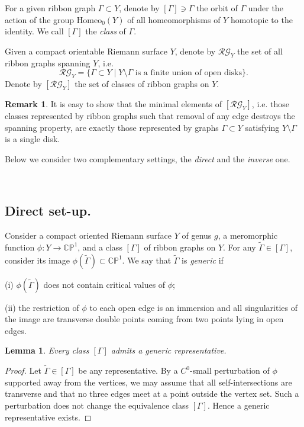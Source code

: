 \documentclass[reqno]{amsart}
\newtheorem{lemma}[theorem]{Lemma}
\theoremstyle{definition}
\newtheorem{remark}[theorem]{Remark}
\newcommand {\Ga}{\Gamma}
\newcommand {\bCP} {\mathbb {CP}}
\newcommand \RG {\mathcal {RG}}
\begin{document}
For a given ribbon graph $\Ga\subset Y$, denote by $[\Ga]\ni \Ga$ the orbit of $\Ga$ under the action of the group $\mathrm{Homeo}_0(Y)$ of all homeomorphisms of $Y$ homotopic to the identity. We call $[\Ga]$ the \emph{class} of $\Ga$.

Given a compact orientable Riemann surface $Y$, denote by $\RG_Y$ the set of all ribbon graphs spanning $Y$, i.e.
\[
\RG_Y=\{\Ga\subset Y\mid Y\setminus \Ga \text{ is a finite union of open disks}\}.
\]
Denote by $[\RG_Y]$ the set of classes of ribbon graphs on $Y$.

\begin{remark}
It is easy to show that the minimal elements of $[\RG_Y]$, i.e.
those classes represented by ribbon graphs such that removal of any edge destroys the spanning property, are exactly those represented by graphs $\Ga\subset Y$ satisfying $Y\setminus \Ga$ is a single disk.
\end{remark}

Below we consider two complementary settings, the \emph{direct} and the \emph{inverse} one.

\
\subsection{Direct set-up.}
Consider a compact oriented Riemann surface $Y$ of genus $g$, a meromorphic function $\phi:Y\to \bCP^1$, and a class $[\Ga]$ of ribbon graphs on $Y$. For any $\widetilde \Ga\in[\Ga]$, consider its image $\phi(\widetilde \Ga)\subset \bCP^1$. We say that $\widetilde \Ga$ is \emph{generic} if

\smallskip
\noindent
(i) $\phi(\widetilde \Ga)$ does not contain critical values of $\phi$;

\smallskip
\noindent
(ii) the restriction of $\phi$ to each open edge is an immersion and all singularities of the image are transverse double points coming from two points lying in open edges.

\begin{lemma}\label{lm:generic}
Every class $[\Gamma]$ admits a generic representative.
\end{lemma}

\begin{proof}
Let $\widetilde\Gamma\in[\Gamma]$ be any representative. By a $C^0$-small perturbation of $\phi$ supported away from the vertices, we may assume that all self-intersections are transverse and that no three edges meet at a point outside the vertex set. Such a perturbation does not change the equivalence class $[\Gamma]$. Hence a generic representative exists.
\end{proof}
\end{document}
